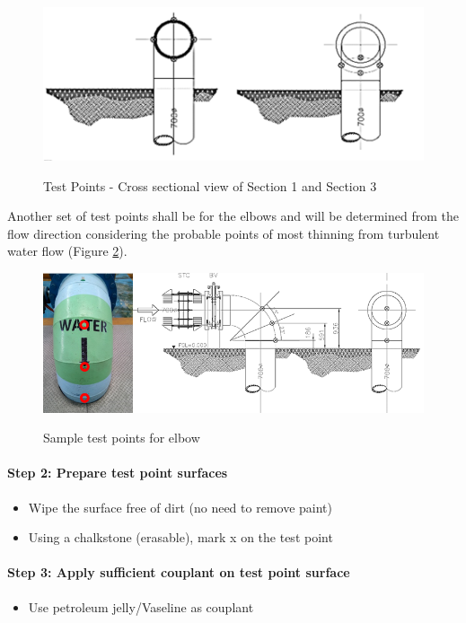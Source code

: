 \begin{figure}[!htb]
	\includegraphics[scale=1.3]{figures/ch02_samplepumptestpoints02} \\
	\caption{Test Points - Cross sectional view of Section 1 and Section 3}
	\label{ch02_samplepumptestpoints02} 
\end{figure}

Another set of test points shall be for the elbows and will be determined from the flow direction considering the probable points of most thinning from turbulent water flow (Figure \ref{ch02_samplepumptestpoints03}). 

\begin{figure}[!htb]
	\includegraphics[scale=1.5]{figures/ch02_samplepumptestpoints03} \\
	\caption{Sample test points for elbow}
	\label{ch02_samplepumptestpoints03} 
\end{figure}

\paragraph{Step 2: Prepare test point surfaces}
\begin{itemize}
\item	Wipe the surface free of dirt (no need to remove paint)
\item	Using a chalkstone (erasable), mark x on the test point
\end{itemize}

\paragraph{Step 3: Apply sufficient couplant on test point surface}
\begin{itemize}
\item	Use petroleum jelly/Vaseline as couplant
\end{itemize}

